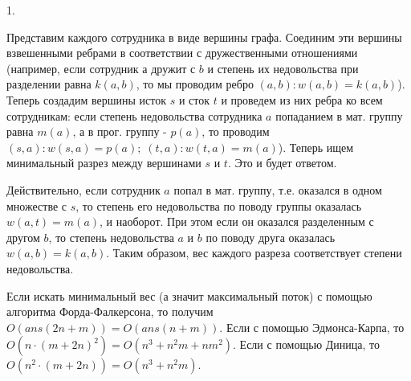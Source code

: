 1.

Представим каждого сотрудника в виде вершины графа. Соединим эти вершины взвешенными ребрами в соответствии с дружественными отношениями (например, если сотрудник $а$ дружит с $b$ и степень их недовольства при разделении равна $k(a, b)$, то мы проводим ребро $(a, b) : w(a, b) = k(a, b)$). Теперь создадим вершины исток $s$ и сток $t$ и проведем из них ребра ко всем сотрудникам: если степень недовольства сотрудника $a$ попаданием в мат. группу равна $m(a)$, а в прог. группу - $p(a)$, то проводим $(s, a) : w(s, a) = p(a);\; (t, a) : w(t, a) = m(a)$). Теперь ищем минимальный разрез между вершинами $s$ и $t$. Это и будет ответом.

Действительно, если сотрудник $a$ попал в мат. группу, т.е. оказался в одном множестве с $s$, то степень его недовольства по поводу группы оказалась $w(a, t) = m(a)$, и наоборот. При этом если он оказался разделенным с другом $b$, то степень недовольства $a$ и $b$ по поводу друга оказалась $w(a, b) = k(a, b)$. Таким образом, вес каждого разреза соответствует степени недовольства.

Если искать минимальный вес (а значит максимальный поток) с помощью алгоритма Форда-Фалкерсона, то получим $O(\mathit{ans}(2n + m)) = O(\mathit{ans}(n + m))$. Если с помощью Эдмонса-Карпа, то $O\left(n \cdot (m + 2n)^2\right) = O\left(n^3 + n^2 m + nm^2\right)$. Если с помощью Диница, то $O\left(n^2 \cdot (m + 2n)\right) = O\left(n^3 + n^2 m\right)$.
